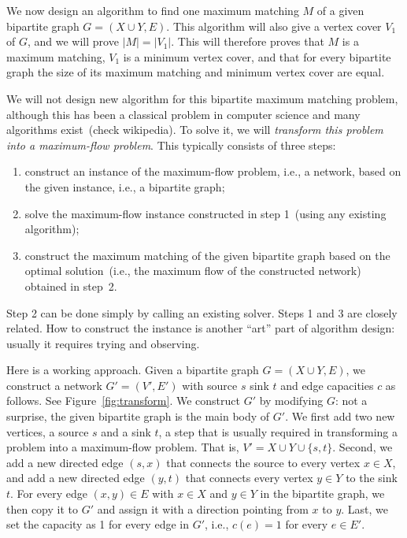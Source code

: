 \documentclass[letterpaper,11pt]{article}
\theoremstyle{mytheorem}
\begin{document}
We now design an algorithm to find one maximum matching $M$ of a given bipartite graph $G = (X\cup Y, E)$.
This algorithm will also give a vertex cover $V_1$ of $G$, and we will prove $|M| = |V_1|$.
This will therefore proves that $M$ is a maximum matching, $V_1$ is a minimum vertex cover, and that
for every bipartite graph the size of its maximum matching and minimum vertex cover are equal.

We will not design new algorithm for this bipartite maximum matching problem, although this has
been a classical problem in computer science and many algorithms exist~(check wikipedia).
To solve it, we will \emph{transform this problem into a maximum-flow problem}.
This typically consists of three steps:
\vspace*{-\topsep}
\begin{enumerate}
\item construct an instance of the maximum-flow problem, i.e., a network, based on the given instance, i.e., a bipartite graph;
\item solve the maximum-flow instance constructed in step 1~(using any existing algorithm);
\item construct the maximum matching of the given bipartite graph based on the optimal solution~(i.e., the maximum flow
of the constructed network) obtained in step~2.
\end{enumerate}

Step 2 can be done simply by calling an existing solver. Steps 1 and 3 are closely related.
How to construct the instance is another ``art'' part of algorithm design: usually it requires
trying and observing.

Here is a working approach. Given a bipartite graph $G = (X\cup Y, E)$, we construct
a network $G' = (V', E')$ with source $s$ sink $t$ and edge capacities $c$ as follows.
See Figure~\ref{fig:transform}.
We construct $G'$ by modifying $G$: not a surprise, the given bipartite graph is the main
body of $G'$.
We first add two new vertices, a source $s$ and a sink $t$, a step that is usually required
in transforming a problem into a maximum-flow problem.
That is, $V' = X\cup Y\cup \{s, t\}$.
Second, we add a new directed edge $(s,x)$ that connects the source to every vertex $x\in X$, 
and add a new directed edge $(y,t)$ that connects every vertex $y\in Y$ to the sink $t$. 
For every edge $(x,y)\in E$ with $x\in X$ and $y\in Y$ in the bipartite graph,
we then copy it to $G'$ and assign it with a direction pointing from $x$ to $y$.
Last, we set the capacity as 1 for every edge in $G'$, i.e., $c(e) = 1$ for every $e\in E'$.
\end{document}

